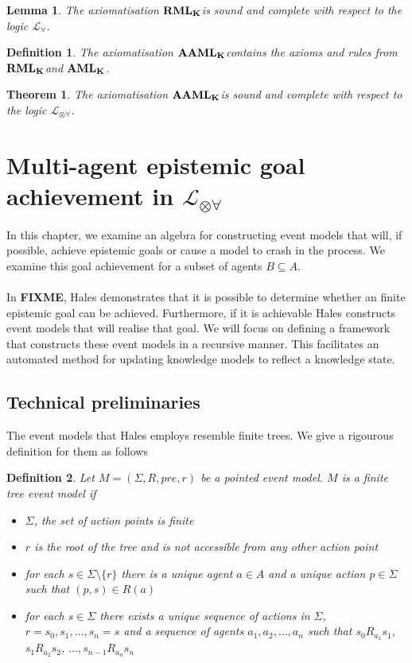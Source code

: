 \documentclass[12pt, a4paper, titlepage]{scrartcl}
\newtheorem{defn}{Definition}[subsection]
\newtheorem{thm}{Theorem}[subsection]
\newtheorem{lemma}{Lemma}[subsection]
\numberwithin{equation}{section}
\newcommand{\lang}{\mathcal{L}}
\newcommand{\langRefine}{\lang_{\forall}}
\newcommand{\langArbAct}{\lang_{\otimes\forall}}
\newcommand{\AXK}{{\bf K}}
\newcommand{\AXAML}{${\bf AML_{\AXK}}$}
\newcommand{\AXRML}{${\bf RML_{\AXK}}$}
\newcommand{\AXAAML}{${\bf AAML_{\AXK}}$}
\newcommand{\FIXME}{{\bf FIXME}}
\begin{document}
\begin{lemma} \label{axiomRMLSoundComplete}
The axiomatisation \AXRML is sound and complete with respect to the logic $\langRefine$.
\end{lemma}

\begin{defn} \label{axiomAAML}
The axiomatisation \AXAAML contains the axioms and rules from \AXRML and \AXAML.
\end{defn}

\begin{thm} \label{axiomAAMLSoundComplete}
The axiomatisation \AXAAML is sound and complete with respect to the logic $\langArbAct$.
\end{thm}

\section{Multi-agent epistemic goal achievement in $\langArbAct$}

In this chapter, we examine an algebra for constructing event models that will, if possible, achieve
epistemic goals or cause a model to crash in the process.
We examine this goal achievement for a subset of agents $B \subseteq A$.\\
\\
In \FIXME, Hales demonstrates that it is possible to determine whether an
finite epistemic goal can be achieved.
Furthermore, if it is achievable Hales constructs event models that will realise
that goal.
We will focus on defining a framework that constructs these event models in a
recursive manner.
This facilitates an automated method for updating knowledge models to reflect a
knowledge state.

\subsection{Technical preliminaries}

The event models that Hales employs resemble finite trees.
We give a rigourous definition for them as follows

\begin{defn} \label{finTree}
Let $M = (\Sigma, R, pre, r)$ be a pointed event model.
$M$ is a finite tree event model if
\begin{itemize}
	\item $\Sigma$, the set of action points is finite
	\item $r$ is the root of the tree and is not accessible from any other action point
	\item for each $s \in \Sigma \setminus \{ r \}$ there is a unique agent $a \in A$ and a unique
	action $p \in \Sigma$ such that $(p,s) \in R(a)$
	\item for each $s \in \Sigma$ there exists a unique sequence of actions in $\Sigma$, $r = s_0,
	s_1, \ldots, s_n = s$ and a sequence of agents $a_1, a_2, \ldots, a_n$ such that $s_0 R_{a_1}
	s_1$, $s_1 R_{a_2} s_2$, $\ldots, s_{n-1} R_{a_n} s_n$
\end{itemize}
\end{defn}
\end{document}
